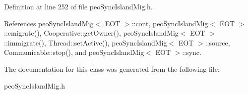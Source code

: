 Definition at line 252 of file peo\-Sync\-Island\-Mig.h.

References peo\-Sync\-Island\-Mig$<$ EOT $>$::cont, peo\-Sync\-Island\-Mig$<$ EOT $>$::emigrate(), Cooperative::get\-Owner(), peo\-Sync\-Island\-Mig$<$ EOT $>$::immigrate(), Thread::set\-Active(), peo\-Sync\-Island\-Mig$<$ EOT $>$::source, Communicable::stop(), and peo\-Sync\-Island\-Mig$<$ EOT $>$::sync.

The documentation for this class was generated from the following file:\begin{CompactItemize}
\item 
peo\-Sync\-Island\-Mig.h\end{CompactItemize}
